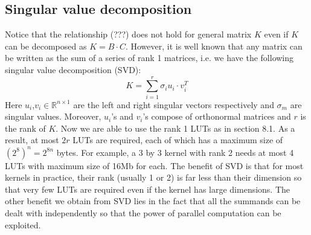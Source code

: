 \documentclass[12pt]{amsart}
\theoremstyle{definition}
\theoremstyle{remark}
\numberwithin{thm}{section}
\begin{document}
\subsection{Singular value decomposition}
Notice that the relationship (???) does not hold for general matrix $K$ even if $K$ can be decomposed as $K=B\cdot C$. However, it is well known that any matrix can be written as the sum of a series of rank 1 matrices, i.e. we have the following singular value decomposition (SVD): 
\[K=\sum_{i=1}^{r}\sigma_i u_i\cdot v_i^T\]
Here $u_i$,$v_i\in\mathbb{R}^{n\times 1}$ are the left and right singular vectors respectively and $\sigma_m$ are singular values. Moreover, $u_i$'s and $v_i$'s compose of orthonormal matrices and $r$ is the rank of $K$. Now we are able to use the rank 1 LUTs as in section 8.1. As a result, at most $2r$ LUTs are required, each of which has a maximum size of $(2^8)^n=2^{8n}$ bytes. For example, a 3 by 3 kernel with rank 2 needs at most 4 LUTs with maximum size of 16Mb for each. The benefit of SVD is that for most kernels in practice, their rank (usually 1 or 2) is far less than their dimension so that very few LUTs are required even if the kernel has large dimensions. The other benefit we obtain from SVD lies in the fact that all the summands can be dealt with independently so that the power of parallel computation can be exploited. 
\end{document}
